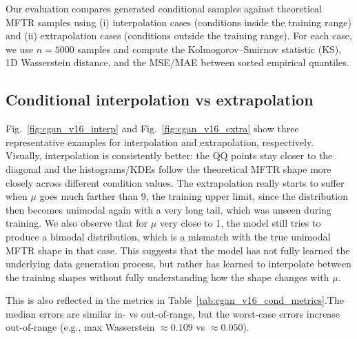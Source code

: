 Our evaluation compares generated conditional samples against theoretical MFTR samples using (i) interpolation cases (conditions inside the training range) and (ii) extrapolation cases (conditions outside the training range). For each case, we use $n=5000$ samples and compute the Kolmogorov--Smirnov statistic (KS), 1D Wasserstein distance, and the MSE/MAE between sorted empirical quantiles.

\subsection{Conditional interpolation vs extrapolation}
Fig.\ \ref{fig:cgan_v16_interp} and Fig.\ \ref{fig:cgan_v16_extra} show three representative examples for interpolation and extrapolation, respectively. Visually, interpolation is consistently better: the QQ points stay closer to the diagonal and the histograms/KDEs follow the theoretical MFTR shape more closely across different condition values. The extrapolation really starts to suffer when $\mu$ goes much farther than 9, the training upper limit, since the distribution then becomes unimodal again with a very long tail, which was unseen during training. We also observe that for $\mu$ very close to 1, the model still tries to produce a bimodal distribution, which is a mismatch with the true unimodal MFTR shape in that case. This suggests that the model has not fully learned the underlying data generation process, but rather has learned to interpolate between the training shapes without fully understanding how the shape changes with $\mu$.

This is also reflected in the metrics in Table\ \ref{tab:cgan_v16_cond_metrics}.The median errors are similar in- vs out-of-range, but the worst-case errors increase out-of-range (e.g., max Wasserstein $\approx 0.109$ vs $\approx 0.050$).

\begin{table}[h]
	\centering
	\caption{Conditional metrics (min / median / max) for interpolation (in-range) and extrapolation (out-of-range).}
	\label{tab:cgan_v16_cond_metrics}
	\small
\end{table}

